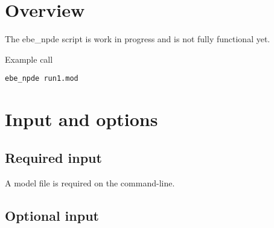 



\maketitle
\newcommand{\guidetoolname}{ebe\_npde}


\section{Overview}

The ebe\_npde script is work in progress and is not fully functional yet.

Example call
\begin{verbatim}
ebe_npde run1.mod
\end{verbatim}

\section{Input and options}

\subsection{Required input}

A model file is required on the command-line.

\subsection{Optional input}

